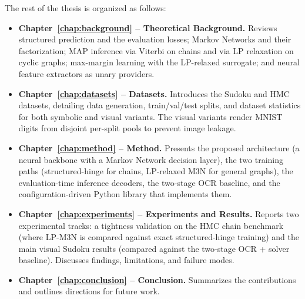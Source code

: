 The rest of the thesis is organized as follows:
\begin{itemize}
    \item \textbf{Chapter~\ref{chap:background} -- Theoretical
    Background.} Reviews structured prediction and the evaluation
    losses; Markov Networks and their factorization; MAP inference
    via Viterbi on chains and via LP relaxation on cyclic graphs;
    max-margin learning with the LP-relaxed surrogate; and neural
    feature extractors as unary providers.
    \item \textbf{Chapter~\ref{chap:datasets} -- Datasets.}
    Introduces the Sudoku and HMC datasets, detailing data
    generation, train/val/test splits, and dataset statistics for
    both symbolic and visual variants. The visual variants render
    MNIST digits from disjoint per-split pools to prevent image
    leakage.
    \item \textbf{Chapter~\ref{chap:method} -- Method.} Presents
    the proposed architecture (a neural backbone with a Markov
    Network decision layer), the two training paths
    (structured-hinge for chains, LP-relaxed M3N for general
    graphs), the evaluation-time inference decoders, the two-stage
    OCR baseline, and the configuration-driven Python library that
    implements them.
    \item \textbf{Chapter~\ref{chap:experiments} -- Experiments
    and Results.} Reports two experimental tracks: a tightness
    validation on the HMC chain benchmark (where LP-M3N is compared
    against exact structured-hinge training) and the main visual
    Sudoku results (compared against the two-stage OCR + solver
    baseline). Discusses findings, limitations, and failure modes.
    \item \textbf{Chapter~\ref{chap:conclusion} -- Conclusion.}
    Summarizes the contributions and outlines directions for future
    work.
\end{itemize}
